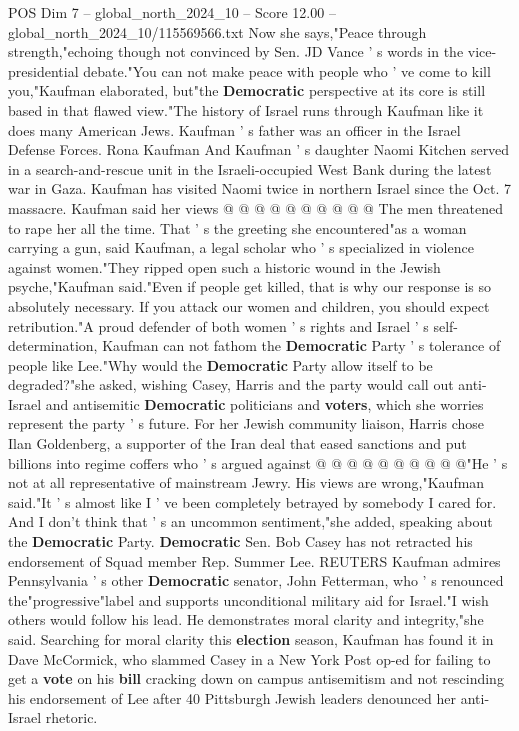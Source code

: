 \begin{textsample}{POS Dim 7 – global\_north\_2024\_10 – Score 12.00 – global\_north\_2024\_10/115569566.txt}
Now she says,"Peace through strength,"echoing though not convinced by Sen.
JD Vance ' s words in the vice-presidential debate."You can not make peace with people who ' ve come to kill you,"Kaufman elaborated, but"the \textbf{Democratic} perspective at its core is still based in that flawed view."The history of Israel runs through Kaufman like it does many American Jews.
Kaufman ' s father was an officer in the Israel Defense Forces.
Rona Kaufman And Kaufman ' s daughter Naomi Kitchen served in a search-and-rescue unit in the Israeli-occupied West Bank during the latest war in Gaza.
Kaufman has visited Naomi twice in northern Israel since the Oct. 7 massacre.
Kaufman said her views @ @ @ @ @ @ @ @ @ @ The men threatened to rape her all the time.
That ' s the greeting she encountered"as a woman carrying a gun, said Kaufman, a legal scholar who ' s specialized in violence against women."They ripped open such a historic wound in the Jewish psyche,"Kaufman said."Even if people get killed, that is why our response is so absolutely necessary.
If you attack our women and children, you should expect retribution."A proud defender of both women ' s rights and Israel ' s self-determination, Kaufman can not fathom the \textbf{Democratic} Party ' s tolerance of people like Lee."Why would the \textbf{Democratic} Party allow itself to be degraded?"she asked, wishing Casey, Harris and the party would call out anti-Israel and antisemitic \textbf{Democratic} politicians and \textbf{voters}, which she worries represent the party ' s future.
For her Jewish community liaison, Harris chose Ilan Goldenberg, a supporter of the Iran deal that eased sanctions and put billions into regime coffers who ' s argued against @ @ @ @ @ @ @ @ @ @"He ' s not at all representative of mainstream Jewry.
His views are wrong,"Kaufman said."It ' s almost like I ' ve been completely betrayed by somebody I cared for.
And I don't think that ' s an uncommon sentiment,"she added, speaking about the \textbf{Democratic} Party. \textbf{Democratic} Sen.
Bob Casey has not retracted his endorsement of Squad member Rep.
Summer Lee.
REUTERS Kaufman admires Pennsylvania ' s other \textbf{Democratic} senator, John Fetterman, who ' s renounced the"progressive"label and supports unconditional military aid for Israel."I wish others would follow his lead.
He demonstrates moral clarity and integrity,"she said.
Searching for moral clarity this \textbf{election} season, Kaufman has found it in Dave McCormick, who slammed Casey in a New York Post op-ed for failing to get a \textbf{vote} on his \textbf{bill} cracking down on campus antisemitism and not rescinding his endorsement of Lee after 40 Pittsburgh Jewish leaders denounced her anti-Israel rhetoric.

\end{textsample}
